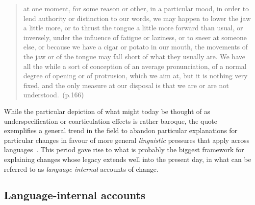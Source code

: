 \begin{quote}
at one moment, for some reason or other, in a particular mood, in order to lend authority or distinction to our words, we may happen to lower the jaw a little more, or to thrust the tongue a little more forward than usual, or inversely, under the influence of fatigue or laziness, or to sneer at someone else, or because we have a cigar or potato in our mouth, the movements of the jaw or of the tongue may fall short of what they usually are. We have all the while a sort of conception of an average pronunciation, of a normal degree of opening or of protrusion, which we aim at, but it is nothing very fixed, and the only measure at our disposal is that we are or are not understood.~(p.166)
\end{quote}

While the particular depiction of what might today be thought of as underspecification or coarticulation effects is rather baroque, the quote exemplifies a general trend in the field to abandon particular explanations for particular changes in favour of more general \emph{linguistic} pressures that apply across languages~\citep[see also][ch.21]{Bloomfield1933}. This period gave rise to what is probably the biggest framework for explaining changes whose legacy extends well into the present day, in what can be referred to as \emph{language-internal} accounts of change.

\subsection{Language-internal accounts}

